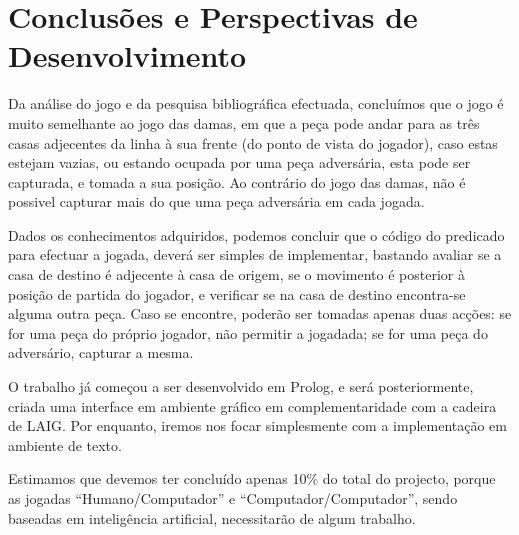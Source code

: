 \documentclass[15pt,a4paper]{article}
\begin{document}

\section{Conclusões e Perspectivas de Desenvolvimento}


Da análise do jogo e da pesquisa bibliográfica efectuada, concluímos que o jogo é muito semelhante ao jogo das damas, em que a peça pode andar para as três casas adjecentes da linha à sua frente (do ponto de vista do jogador), caso estas estejam vazias,
ou estando ocupada por uma peça adversária, esta pode ser capturada, e tomada a sua posição. Ao contrário do jogo das damas, não é possivel capturar mais do que uma peça adversária em cada jogada.

Dados os conhecimentos adquiridos, podemos concluir que o código do predicado para efectuar a jogada, deverá ser simples de implementar, bastando avaliar se a casa de destino é adjecente à casa de origem, se o movimento é posterior à posição de partida do jogador,
e verificar se na casa de destino encontra-se alguma outra peça. Caso se encontre, poderão ser tomadas apenas duas acções: se for uma peça do próprio jogador, não permitir a jogadada; se for uma peça do adversário, capturar a mesma.

O trabalho já começou a ser desenvolvido em Prolog, e será posteriormente, criada uma interface em ambiente gráfico em complementaridade com a cadeira de LAIG. Por enquanto, iremos nos focar simplesmente com a implementação em ambiente de texto.

Estimamos que devemos ter concluído apenas 10\% do total do projecto, porque as jogadas ``Humano/Computador'' e ``Computador/Computador'', sendo baseadas em inteligência artificial, necessitarão de algum trabalho.




\clearpage
\end{document}
